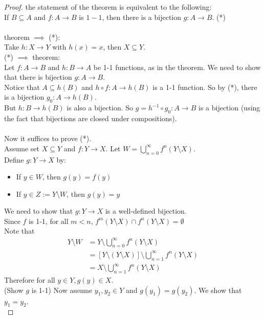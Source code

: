 \documentclass[11pt]{article}
\begin{document}
\begin{proof}
	 the statement of the theorem is equivalent to the following:\\
	If $B \subseteq A$ and $f: A \rightarrow B$ is $1-1$, then there is a bijection $g: A \rightarrow B$. \quad (*) \\\\
	theorem $\implies$ (*): \\
	Take $h: X \rightarrow Y$ with $h(x) = x$, then $X \subseteq Y$. \\
	(*) $\implies$ theorem: \\
	Let $f: A \rightarrow B$ and $h: B \rightarrow A$ be 1-1 functions, as in the theorem. We need to show that there is bijection $g: A \rightarrow B$. \\
	Notice that $A \subseteq h(B)$ and $h \circ f: A \rightarrow h(B) $ is a 1-1 function. So by (*), there is a bijection $g_0: A \rightarrow h(B)$. \\
	But $h: B \rightarrow h(B)$ is also a bijection. So $g = h^{-1} \circ g_0: A \rightarrow B$ is a bijection (using the fact that bijections are closed under compositions). \\\\
	Now it suffices to prove (*). \\
	Assume set $X \subseteq Y$ and $f: Y \rightarrow X$. Let $W = \bigcup_{n=0}^\infty f^n(Y \setminus X)$.\\
	Define $g: Y \rightarrow X$ by:
	\begin{itemize}
		\item If $y \in W$, then $g(y) = f(y)$
		\item If $y \in Z:= Y \setminus W$, then $g(y) = y$
	\end{itemize}
	We need to show that $g: Y \rightarrow X$ is a well-defined bijection. \\
	Since $f$ is 1-1, for all $m < n$, $f^m(Y \setminus X) \cap f^n(Y \setminus X) = \emptyset$\\
	Note that 
	\begin{align*}
		Y \setminus W &= Y \setminus \bigcup_{n=0}^\infty f^n(Y \setminus X) \\
		&= [Y \setminus (Y \setminus X)] \setminus \bigcup_{n=1}^\infty f^n(Y \setminus X) \\
		&= X \setminus \bigcup_{n=1}^\infty f^n(Y \setminus X)
	\end{align*}
	Therefore for all $y \in Y, g(y) \in X$. \\
	(Show $g$ is 1-1) Now assume $y_1, y_2 \in Y$ and $g(y_1) = g(y_2)$. We show that $y_1 = y_2$. \\

\end{proof}
\end{document}
